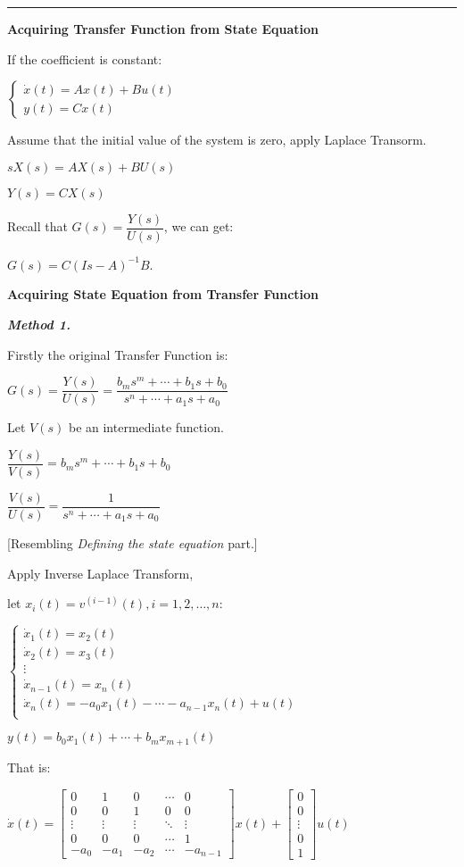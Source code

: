 \documentclass{article}
\newcommand{\sectionline}{\color{black}\rule[2pt]{0.45\textwidth}{0.05em}\color{black}}
\newcommand{\bigtitle}[1]{
	\noindent
	\textbf{#1}
}
\newcommand{\smalltitle}[1]{
	\noindent
	\textbf{\textit{#1}}
}
\newcommand{\properframed}[1]{
	{
		\centering
		\vspace{-2 ex}
		\begin{framed}
			\vspace{-1.5 ex}
			#1
			\vspace{-1.5 ex}
		\end{framed}
		\vspace{-2 ex}
	}
}
\begin{document}
\begin{spacing}{1.2}
\sectionline

\bigtitle{Acquiring Transfer Function from State Equation}

If the coefficient is constant:

$
\left\{\begin{array}{l}{\dot{x}(t)=A x(t)+B u(t)} \\ {y(t)=C x(t)}\end{array}\right.
$

Assume that the initial value of the system is zero, apply Laplace Transorm.

$s X(s)=A X(s)+B U(s)$

$Y(s)=C X(s)$

Recall that $G(s) = \dfrac{Y(s)}{U(s)}$, we can get:

\properframed{
$G(s)=C(I s-A)^{-1} B$.
}

\bigtitle{Acquiring State Equation from Transfer Function}

\smalltitle{Method 1.}

Firstly the original Transfer Function is:

$G(s)=\dfrac{Y(s)}{U(s)}=\dfrac{b_{m} s^{m}+\cdots+b_{1} s+b_{0}}{s^{n}+\cdots+a_{1} s+a_{0}}$

Let $V(s)$ be an intermediate function.

$\dfrac{Y(s)}{V(s)}=b_{m} s^{m}+\cdots+b_{1} s+b_{0}$

$\dfrac{V(s)}{U(s)}=\dfrac{1}{s^{n}+\cdots+a_{1} s+a_{0}}$

[Resembling \textit{Defining the state equation} part.]

Apply Inverse Laplace Transform,

let $x_i(t) = v^{(i-1)}(t), i=1,2,\ldots,n$:

$
\left\{\begin{array}{l}{\dot{x}_{1}(t)=x_{2}(t)} \\ {\dot{x}_{2}(t)=x_{3}(t)} \\ {\vdots} \\ {\dot{x}_{n-1}(t)=x_{n}(t)} \\ {\dot{x}_{n}(t)=-a_{0} x_{1}(t)-\cdots-a_{n-1} x_{n}(t)+u(t)} \\ \end{array}\right.
$

$y(t)=b_{0} x_{1}(t)+\cdots+b_{m} x_{m+1}(t)$

That is:

$\dot{x}(t)=\left[ \begin{array}{ccccc}{0} & {1} & {0} & {\cdots} & {0} \\ {0} & {0} & {1} & {0} & {0} \\ {\vdots} & {\vdots} & {\vdots} & {\ddots} & {\vdots} \\ {0} & {0} & {0} & {\cdots} & {1} \\ {-a_{0}} & {-a_{1}} & {-a_{2}} & {\cdots} & {-a_{n-1}}\end{array}\right] x(t)+\left[ \begin{array}{c}{0} \\ {0} \\ {\vdots} \\ {0} \\ {1}\end{array}\right] u(t)$


\end{spacing}
\end{document}
